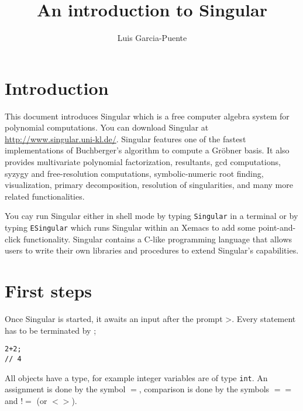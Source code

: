 \documentclass[12pt]{amsart}
\begin{document}
\title{An introduction to Singular}

\author{Luis Garcia-Puente}
\address{Department of Mathematics\\
         Texas A\&M University\\
         College Station\\
         TX \ 77843-3368\\
         USA}

\maketitle

\section*{Introduction}

This document introduces Singular which is a free computer algebra
system for polynomial computations. You can download Singular
at \url{http://www.singular.uni-kl.de/}. Singular features one 
of the fastest implementations of Buchberger's algorithm to compute
a Gr\"obner basis. It also provides multivariate polynomial factorization,
resultants, gcd computations, syzygy and free-resolution computations, 
symbolic-numeric root finding, visualization, primary decomposition, resolution of singularities,
and many more related functionalities.

You cay run Singular either in shell mode by typing \texttt{Singular} in a terminal or by typing
\texttt{ESingular} which runs Singular within an Xemacs to add some point-and-click functionality.
Singular contains a C-like programming language that allows users to write their own libraries and
procedures to extend Singular's capabilities.


\section{First steps}

Once Singular is started, it awaits an input after the prompt >. Every statement has to be terminated by ;

\begin{verbatim}
2+2;
// 4
\end{verbatim}

All objects have a type, for example integer variables are of type \texttt{int}. An assignment is done by the 
symbol $=$, comparison is done by the symbols $==$ and $!=$ (or $<>$).
\end{document}
